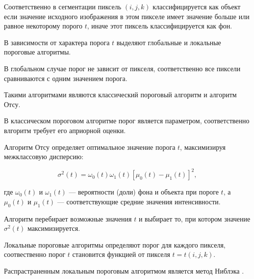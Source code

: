Соответственно в сегментации пиксель \((i, j, k)\) классифицируется как объект если значение исходного изображения в этом пикселе имеет значение больше или равное некоторому порого \(t\), иначе этот пиксель классифицируется как фон.

В зависимости от характера порога \(t\) выделяют глобальные и локальные пороговые алгоритмы.

В глобальном случае порог не зависит от пикселя, соответственно все пиксели сравниваются с одним значением порога.

Такими алгоритмами являются классический пороговый алгоритм и алгоритм Отсу.

В классическом пороговом алгоритме порог является параметром, соответственно влгоритм требует его априорной оценки.

Алгоритм Отсу \cite{otsu1975threshold} определяет оптимальное значение порога \(t\), максимизируя межклассовую дисперсию:

\begin{equation}
    \sigma^2(t) = \omega_0(t) \omega_1(t) \left[ \mu_0(t) - \mu_1(t) \right]^2,
\end{equation}

где \(\omega_0(t)\) и \(\omega_1(t)\) — вероятности (доли) фона и объекта при пороге \(t\), а \(\mu_0(t)\) и \(\mu_1(t)\) — соответствующие средние значения интенсивности.

Алгоритм перебирает возможные значения \(t\) и выбирает то, при котором значение \(\sigma^2(t)\) максимизируется. 

Локальные пороговые алгоритмы определяют порог для каждого пикселя, соотвественно порог \(t\) становится функцией от пикселя \(t = t(i, j, k)\).

Распрастраненным локальным пороговым алгоритмом является метод Ниблэка \cite{niblack1985introduction}.